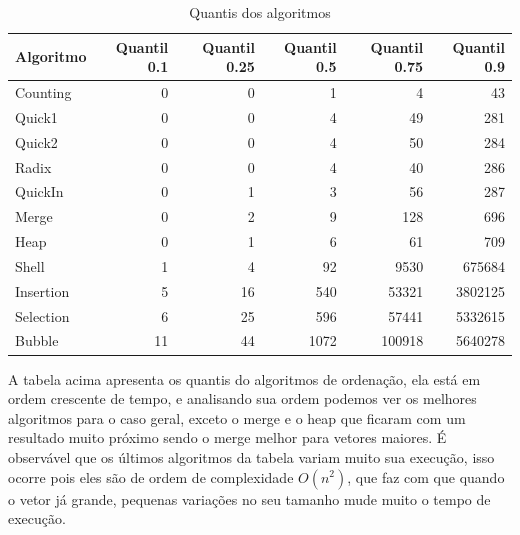 \documentclass[a4paper, 10pt]{article}
\begin{document}
\begin{table}[!h]
	\centering
	\caption{Quantis dos algoritmos}
	\label{label}
	\begin{tabular}{lrrrrr}
		\hline
		Algoritmo & Quantil 0.1 & Quantil 0.25 & Quantil 0.5 & Quantil 0.75 & Quantil 0.9 \\
		\hline
		Counting & 0 & 0 & 1 & 4 & 43 \\
		Quick1 & 0 & 0 & 4 & 49 & 281 \\
		Quick2 & 0 & 0 & 4 & 50 & 284 \\
		Radix & 0 & 0 & 4 & 40 & 286 \\
		QuickIn & 0 & 1 & 3 & 56 & 287 \\
		Merge & 0 & 2 & 9 & 128 & 696 \\
		Heap & 0 & 1 & 6 & 61 & 709\\
		Shell & 1 & 4 & 92 & 9530 & 675684 \\
		Insertion & 5 & 16 & 540 & 53321 & 3802125 \\
		Selection & 6 & 25 & 596 & 57441 & 5332615 \\
		Bubble & 11 & 44 & 1072 & 100918 & 5640278 \\
		\hline
	\end{tabular}
\end{table}

A tabela acima apresenta os quantis do algoritmos de ordenação, ela está em ordem crescente de tempo, e analisando sua ordem podemos ver os melhores algoritmos para o caso geral, exceto o merge e o heap que ficaram com um resultado muito próximo sendo o merge melhor para vetores maiores.
É observável que os últimos algoritmos da tabela variam muito sua execução, isso ocorre pois eles são de ordem de complexidade $O(n^2)$, que faz com que quando o vetor já grande, pequenas variações no seu tamanho mude muito o tempo de execução.
\end{document}
